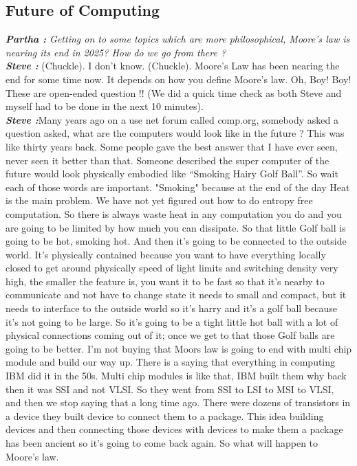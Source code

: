 \documentclass[a4paper, 12pt]{article}
\begin{document}
\begin{flushleft}
        \section*{Future of Computing}
        \textit {\textbf {Partha :} Getting on to some topics which are more philosophical, Moore's law is nearing its end in 2025? How do we go from there ?  \\}
        \textit {\textbf {Steve :}} (Chuckle). I don’t know. (Chuckle). Moore's Law has been nearing the end for some time now. It depends on how you define Moore's law. Oh, Boy! Boy! These are open-ended question !! (We did a quick time check as both Steve and myself had to be done in the next 10 minutes). \\
        \textit {\textbf {Steve :}}Many years ago on a use net forum called comp.org, somebody asked a question asked, what are the computers would look like in the future ? This was like thirty years back. Some people gave the best answer that I have ever seen, never seen it better than that. Someone described the super computer of the future would look physically embodied like  “Smoking Hairy Golf Ball”. So wait each of those words are important. "Smoking" because at the end of the day Heat is the main problem. We have not yet figured out  how to do entropy free computation. So there is always waste heat in any computation you do and you are going to be limited by how much you can dissipate. So that little Golf ball is going to be hot, smoking hot. And then it’s going to be connected to the outside world. It’s physically contained because you want to have everything locally closed  to get around physically speed of light limits and switching density very high, the smaller the feature is, you want it to be fast so that it's nearby to communicate and not have to change state it needs to small and compact, but it needs to interface to the outside world so it’s harry and it’s a golf ball because it's not going to be large. So it's going to be a tight little hot ball with a lot of physical connections coming out of it; once we get to that those Golf balls are going to be better. I'm not buying that Moors law is going to end with multi chip module and build our way up. There is a saying that everything in computing IBM did it in the 50s.  Multi chip modules is like that, IBM built them why back then it was SSI and not VLSI. So they went from SSI to LSI to MSI to VLSI, and then we stop saying that a long time ago. There were dozens of transistors in a device they built device to connect them to a package. This idea building devices and then connecting those devices with devices to make them a package has been ancient so it's going to come back again. So what will happen to Moore's law. \\~\\


\end{flushleft}
\end{document}
